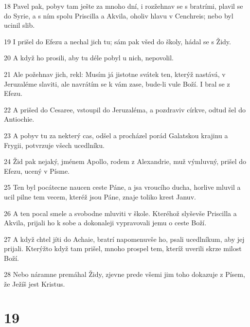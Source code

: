 \par 18 Pavel pak, pobyv tam ješte za mnoho dní, i rozžehnav se s bratrími, plavil se do Syrie, a s ním spolu Priscilla a Akvila, oholiv hlavu v Cenchreis; nebo byl ucinil slib.
\par 19 I prišel do Efezu a nechal jich tu; sám pak všed do školy, hádal se s Židy.
\par 20 A když ho prosili, aby tu déle pobyl u nich, nepovolil.
\par 21 Ale požehnav jich, rekl: Musím já jistotne svátek ten, kterýž nastává, v Jeruzaléme slaviti, ale navrátím se k vám zase, bude-li vule Boží. I bral se z Efezu.
\par 22 A prišed do Cesaree, vstoupil do Jeruzaléma, a pozdraviv církve, odtud šel do Antiochie.
\par 23 A pobyv tu za nekterý cas, odšel a procházel porád Galatskou krajinu a Frygii, potvrzuje všech ucedlníku.
\par 24 Žid pak nejaký, jménem Apollo, rodem z Alexandrie, muž výmluvný, prišel do Efezu, ucený v Písme.
\par 25 Ten byl pocátecne naucen ceste Páne, a jsa vroucího ducha, horlive mluvil a ucil pilne tem vecem, kteréž jsou Páne, znaje toliko krest Januv.
\par 26 A ten pocal smele a svobodne mluviti v škole. Kteréhož slyševše Priscilla a Akvila, prijali ho k sobe a dokonaleji vypravovali jemu o ceste Boží.
\par 27 A když chtel jíti do Achaie, bratrí napomenuvše ho, psali ucedlníkum, aby jej prijali. Kterýžto když tam prišel, mnoho prospel tem, kteríž uverili skrze milost Boží.
\par 28 Nebo náramne premáhal Židy, zjevne prede všemi jim toho dokazuje z Písem, že Ježíš jest Kristus.

\chapter{19}

